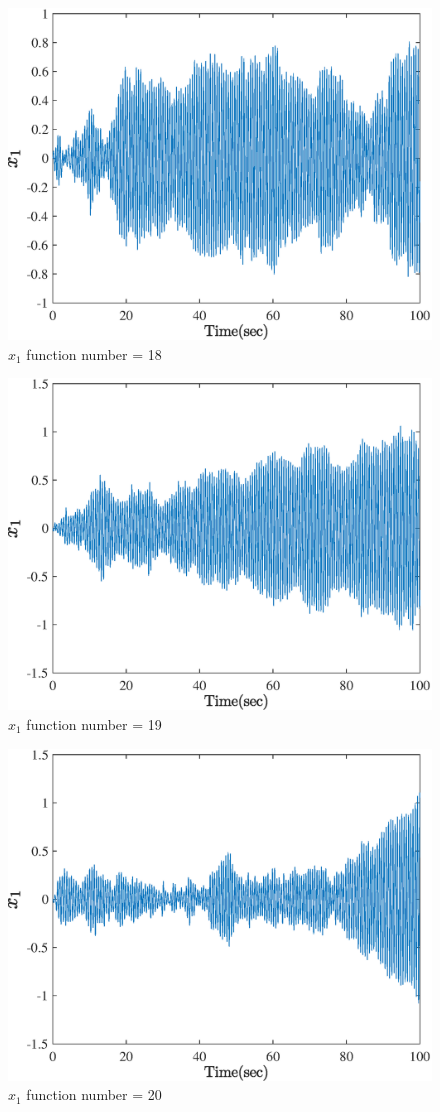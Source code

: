   \begin{figure}[H] 
  	\caption{$x_1$ function number = 18} 
  	\centering 
  	\includegraphics[width=12cm]{../Figure/Q5/part_a/18} 
  \end{figure}
  \begin{figure}[H] 
  	\caption{$x_1$ function number = 19} 
  	\centering 
  	\includegraphics[width=12cm]{../Figure/Q5/part_a/19} 
  \end{figure}
  \begin{figure}[H] 
  	\caption{$x_1$ function number = 20} 
  	\centering 
  	\includegraphics[width=12cm]{../Figure/Q5/part_a/20} 
  \end{figure}
